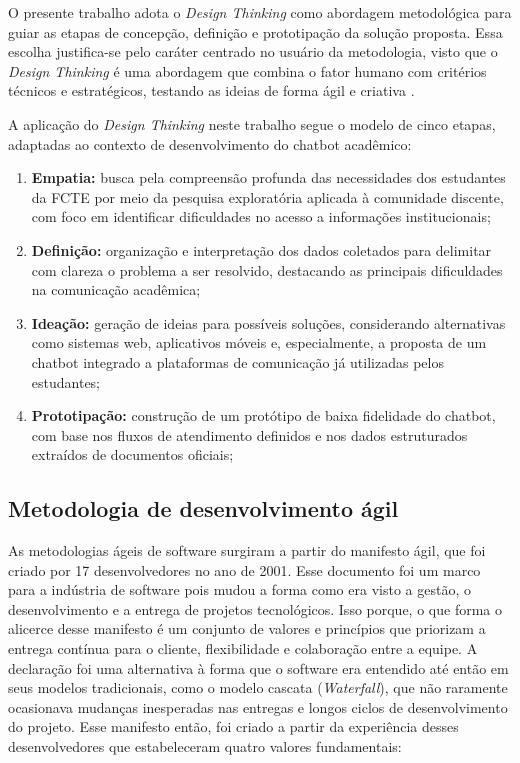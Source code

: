 O presente trabalho adota o \textit{Design Thinking} como abordagem metodológica para guiar as etapas de concepção, definição e prototipação da solução proposta. Essa escolha justifica-se pelo caráter centrado no usuário da metodologia, visto que o \textit{Design Thinking} é uma abordagem que combina o fator humano com critérios técnicos e estratégicos, testando as ideias de forma ágil e criativa \cite{brown2009change}.  

A aplicação do \textit{Design Thinking} neste trabalho segue o modelo de cinco etapas, adaptadas ao contexto de desenvolvimento do chatbot acadêmico:

\begin{enumerate}
    \item \textbf{Empatia:} busca pela compreensão profunda das necessidades dos estudantes da FCTE por meio da pesquisa exploratória aplicada à comunidade discente, com foco em identificar dificuldades no acesso a informações institucionais;
    
    \item \textbf{Definição:} organização e interpretação dos dados coletados para delimitar com clareza o problema a ser resolvido, destacando as principais dificuldades na comunicação acadêmica;
    
    \item \textbf{Ideação:} geração de ideias para possíveis soluções, considerando alternativas como sistemas web, aplicativos móveis e, especialmente, a proposta de um chatbot integrado a plataformas de comunicação já utilizadas pelos estudantes;
    
    \item \textbf{Prototipação:} construção de um protótipo de baixa fidelidade do chatbot, com base nos fluxos de atendimento definidos e nos dados estruturados extraídos de documentos oficiais;
\end{enumerate}

\subsection{Metodologia de desenvolvimento ágil}

As metodologias ágeis de software surgiram a partir do manifesto ágil, que foi criado por 17 desenvolvedores no ano de 2001. Esse documento foi um marco para a indústria de software pois mudou a forma como era visto a gestão, o desenvolvimento e a entrega de projetos tecnológicos. Isso porque, o que forma o alicerce desse manifesto é um conjunto de valores e princípios que priorizam a entrega contínua para o cliente, flexibilidade e colaboração entre a equipe. A declaração foi uma alternativa à forma que o software era entendido até então em seus modelos tradicionais, como o modelo cascata (\textit{Waterfall}), que não raramente ocasionava mudanças inesperadas nas entregas e longos ciclos de desenvolvimento do projeto. Esse manifesto então, foi criado a partir da experiência desses desenvolvedores que estabeleceram quatro valores fundamentais: 

